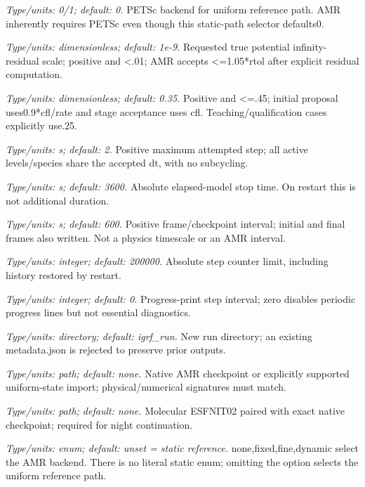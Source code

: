 \begin{description}[style=nextline,leftmargin=0pt,labelindent=0pt,labelwidth=0pt,labelsep=0pt]
\item[\texttt{--petsc-potential}] \textit{Type/units: 0/1; default: 0.} PETSc backend for uniform reference path. AMR inherently requires PETSc even though this static-path selector defaults0.
\item[\texttt{--rtol}] \textit{Type/units: dimensionless; default: 1e-9.} Requested true potential infinity-residual scale; positive and <.01; AMR accepts <=1.05*rtol after explicit residual computation.
\item[\texttt{--cfl}] \textit{Type/units: dimensionless; default: 0.35.} Positive and <=.45; initial proposal uses0.9*cfl/rate and stage acceptance uses cfl. Teaching/qualification cases explicitly use.25.
\item[\texttt{--dt-max}] \textit{Type/units: s; default: 2.} Positive maximum attempted step; all active levels/species share the accepted dt, with no subcycling.
\item[\texttt{--end}] \textit{Type/units: s; default: 3600.} Absolute elapsed-model stop time. On restart this is not additional duration.
\item[\texttt{--output-every}] \textit{Type/units: s; default: 600.} Positive frame/checkpoint interval; initial and final frames also written. Not a physics timescale or an AMR interval.
\item[\texttt{--max-steps}] \textit{Type/units: integer; default: 200000.} Absolute step counter limit, including history restored by restart.
\item[\texttt{--progress-steps}] \textit{Type/units: integer; default: 0.} Progress-print step interval; zero disables periodic progress lines but not essential diagnostics.
\item[\texttt{--out}] \textit{Type/units: directory; default: igrf\_run.} New run directory; an existing metadata.json is rejected to preserve prior outputs.
\item[\texttt{--restart}] \textit{Type/units: path; default: none.} Native AMR checkpoint or explicitly supported uniform-state import; physical/numerical signatures must match.
\item[\texttt{--night-restart}] \textit{Type/units: path; default: none.} Molecular ESFNIT02 paired with exact native checkpoint; required for night continuation.
\item[\texttt{--amr-mode}] \textit{Type/units: enum; default: unset = static reference.} none,fixed,fine,dynamic select the AMR backend. There is no literal static enum; omitting the option selects the uniform reference path.

\end{description}
